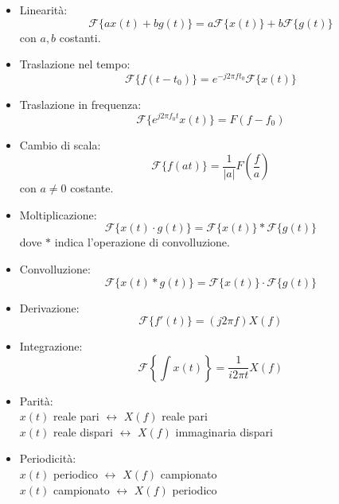 \documentclass{article}
\begin{document}
\begin{itemize}
    \item Linearità: 
    $$\mathcal{F}\{a x(t) + b g(t)\} = a \mathcal{F}\{x(t)\} + b \mathcal{F}\{g(t)\}$$
    con $a,b$ costanti.
    
    \item Traslazione nel tempo:
    $$ \mathcal{F}\{f(t - t_0)\} = e^{-j 2 \pi f t_0} \mathcal{F}\{x(t)\} $$

    \item Traslazione in frequenza:
    $$ \mathcal{F}\{e^{j 2 \pi f_0 t} x(t)\} = F(f - f_0) $$

    \item Cambio di scala:
    $$ \mathcal{F}\{f(at)\} = \frac{1}{|a|} F\left(\frac{f}{a}\right) $$
    con $a\neq0$ costante.

    \item Moltiplicazione:
    $$ \mathcal{F}\{x(t) \cdot g(t)\} = \mathcal{F}\{x(t)\} * \mathcal{F}\{g(t)\} $$
    dove $*$ indica l'operazione di convolluzione.

    \item Convolluzione:
    $$ \mathcal{F}\{x(t) * g(t)\} = \mathcal{F}\{x(t)\} \cdot \mathcal{F}\{g(t)\} $$

    \item Derivazione:
    $$ \mathcal{F}\{f'(t)\} = (j 2 \pi f) X(f) $$

    \item Integrazione:
    $$ \mathcal{F}\left\{\int x(t)\right\} = \frac{1}{i 2 \pi t}X(f) $$

    \item Parità:\\
    $x(t)$ reale pari $\leftrightarrow$ $X(f)$ reale pari\\
    $x(t)$ reale dispari $\leftrightarrow$ $X(f)$ immaginaria dispari

    \item Periodicità:\\
    $x(t)$ periodico $\leftrightarrow$ $X(f)$ campionato\\
    $x(t)$ campionato $\leftrightarrow$ $X(f)$ periodico  

\end{itemize}
\end{document}
